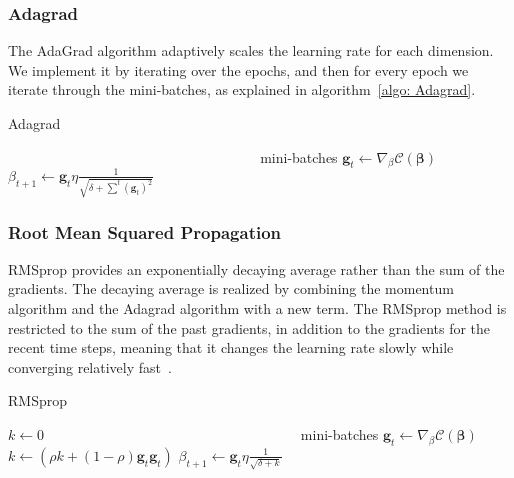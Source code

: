 \documentclass[english,notitlepage,reprint,nofootinbib]{revtex4-2}  %
\begin{document}
\subsubsection*{Adagrad} %
The AdaGrad algorithm adaptively scales the learning rate for each dimension. We implement it by iterating over the epochs, and then for every epoch we iterate through the mini-batches, as explained in algorithm~\ref{algo: Adagrad}. %

\begin{algorithm}[H]
    \caption{Adagrad}\label{algo: Adagrad}
    \begin{algorithmic}
         
        \State $\:\:\:\:\:\:\:\:\:\:\:\:\:\:\:\:\:\:\:\:\:\:\:\:\:\:\:\:\:\:\:\:\:\:\:\:\:\:\:\:\:\:\:\:\:\:\:\:\:\:\:\:\:\:\:\:\:\:\:\:\:\:\:\:\:\:\:\:\:\:\:\:\:\:\:\:\:\:\:\:$ mini-batches
        \State $\mathbf{g}_t \leftarrow \nabla_\beta \mathcal{C}(\boldsymbol{\beta})$ 
        \State $\beta_{t+1} \leftarrow \mathbf{g}_t \eta \frac{1}{\sqrt{\delta+ \sum^t(\mathbf{g}_t)^2}}$
    \end{algorithmic}
\end{algorithm}

\subsubsection*{Root Mean Squared Propagation}
RMSprop provides an exponentially decaying average rather than the sum of the gradients. The decaying average is realized by combining the momentum algorithm and the Adagrad algorithm with a new term. The RMSprop method is restricted to the sum of the past gradients, in addition to the gradients for the recent time steps, meaning that it changes the learning rate slowly while converging relatively fast~\cite{lecture_notes}. 

\begin{algorithm}[H]
    \caption{RMSprop}\label{algo: RMSprop}
    \begin{algorithmic}
         
        \State $k \leftarrow 0$
        \State $\:\:\:\:\:\:\:\:\:\:\:\:\:\:\:\:\:\:\:\:\:\:\:\:\:\:\:\:\:\:\:\:\:\:\:\:\:\:\:\:\:\:\:\:\:\:\:\:\:\:\:\:\:\:\:\:\:\:\:\:\:\:\:\:\:\:\:\:\:\:\:\:\:\:\:\:\:\:\:\:$ mini-batches
        \State $\mathbf{g}_t \leftarrow \nabla_\beta \mathcal{C}(\boldsymbol{\beta})$
        \State $k \leftarrow (\rho k + (1 - \rho)\mathbf{g}_t \mathbf{g}_t)$
        \State $\beta_{t+1} \leftarrow \mathbf{g}_t \eta \frac{1}{\sqrt{\delta + k}}$
    \end{algorithmic}
\end{algorithm}
\end{document}
